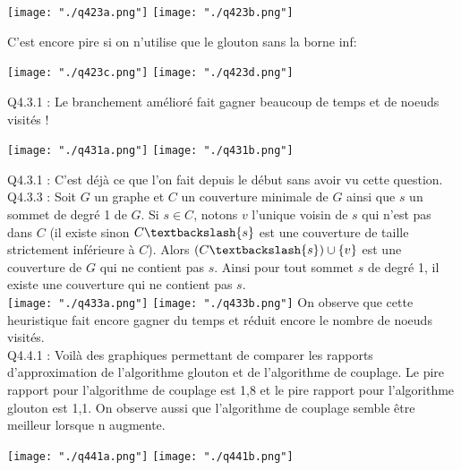 \documentclass[a4paper]{article}
\begin{document}
\texttt{[image: "./q423a.png"]}
\texttt{[image: "./q423b.png"]}

C'est encore pire si on n'utilise que le glouton sans la borne inf:

\texttt{[image: "./q423c.png"]}
\texttt{[image: "./q423d.png"]}

Q4.3.1 : 
Le branchement amélioré fait gagner beaucoup de temps et de noeuds visités !

\texttt{[image: "./q431a.png"]}
\texttt{[image: "./q431b.png"]}

Q4.3.1 : 
C'est déjà ce que l'on fait depuis le début sans avoir vu cette question. \\

Q4.3.3 :
Soit $G$ un graphe et $C$ un couverture minimale de $G$ ainsi que $s$ un sommet de degré 1 de $G$. Si $s \in C$, notons $v$ l'unique voisin de $s$ qui n'est pas dans $C$ (il existe sinon $C\textbackslash\{s\}$ est une couverture de taille strictement inférieure à $C$). Alors $(C\textbackslash\{s\}) \cup \{v\}$ est une couverture de $G$ qui ne contient pas $s$. Ainsi pour tout sommet $s$ de degré 1, il existe une couverture qui ne contient pas $s$. \\
\texttt{[image: "./q433a.png"]}
\texttt{[image: "./q433b.png"]}
On observe que cette heuristique fait encore gagner du temps et réduit encore le nombre de noeuds visités. \\

Q4.4.1 : 
Voilà des graphiques permettant de comparer les rapports d'approximation de l'algorithme glouton et de l'algorithme de couplage. Le pire rapport pour l'algorithme de couplage est 1,8 et le pire rapport pour l'algorithme glouton est 1,1. On observe aussi que l'algorithme de couplage semble être meilleur lorsque n augmente.

\texttt{[image: "./q441a.png"]}
\texttt{[image: "./q441b.png"]}
\end{document}
